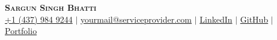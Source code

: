 

\begin{center}
    \textbf{\Huge \scshape Sargun Singh Bhatti} \\ \vspace{3pt}
        \small
	\faMobile \hspace{.5pt} \href{tel:0000000000}{+1 (437) 984 9244}
        $|$
    \faAt \hspace{.5pt} \href{mailto:yourmail@serviceprovider.com}{yourmail@serviceprovider.com}
        $|$
    \faLinkedinSquare \hspace{.5pt} \href{https://www.google.com}{LinkedIn}
        $|$
    \faGithub \hspace{.5pt} \href{https://www.google.com}{GitHub}
        $|$
        \faGlobe \hspace{.5pt} \href{https://www.google.com}{Portfolio}
\end{center}
